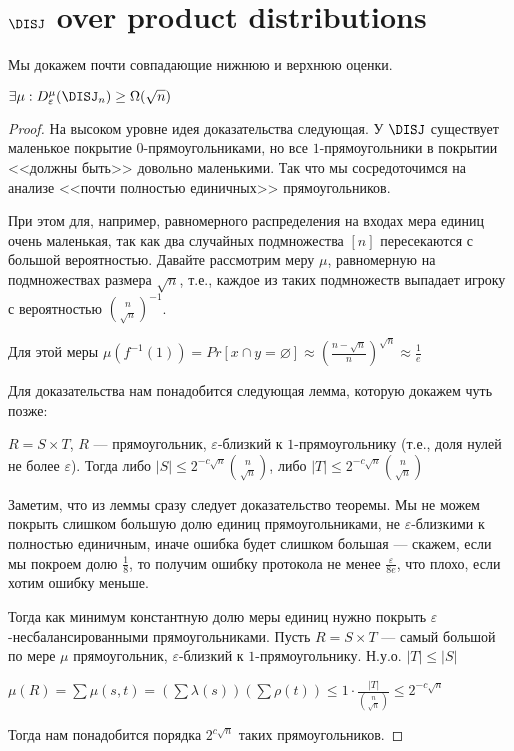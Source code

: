 \section{$\DISJ$ over product distributions}

Мы докажем почти совпадающие нижнюю и верхнюю оценки.

\begin{theorem}
$\exists \mu : D_{\varepsilon}^{\mu}(\DISJ_n) \geq \Omega(\sqrt{n})$
\end{theorem}

\begin{proof}

На высоком уровне идея доказательства следующая. У $\DISJ$ существует маленькое покрытие $0$-прямоугольниками, но все $1$-прямоугольники в покрытии <<должны быть>> довольно маленькими. Так что мы сосредоточимся на анализе <<почти полностью единичных>> прямоугольников.

При этом для, например, равномерного распределения на входах мера единиц очень маленькая, так как два случайных подмножества $[n]$ пересекаются с большой вероятностью. Давайте рассмотрим меру $\mu$, равномерную на подмножествах размера $\sqrt{n}$, т.е., каждое из таких подмножеств выпадает игроку с вероятностью ${{n}\choose{\sqrt{n}}}^{-1}$. 

Для этой меры $\mu(f^{-1}(1)) = Pr[x \cap y = \varnothing] \approx (\frac{n -  \sqrt{n}}{n})^{\sqrt{n}} \approx \frac{1}{e}$

Для доказательства нам понадобится следующая лемма, которую докажем чуть позже:

\begin{lemma}
$R = S \times T$, $R$ --- прямоугольник, $\varepsilon$-близкий к $1$-прямоугольнику (т.е., доля нулей не более $\varepsilon$). Тогда либо $|S| \leq 2^{-c\sqrt{n}} {{n}\choose{\sqrt{n}}}$, либо $|T| \leq 2^{-c\sqrt{n}} {{n}\choose{\sqrt{n}}}$ 
\end{lemma}

Заметим, что из леммы сразу следует доказательство теоремы. Мы не можем покрыть слишком большую долю единиц прямоугольниками, не $\varepsilon$-близкими к полностью единичным, иначе ошибка будет слишком большая --- скажем, если мы покроем долю $\frac{1}{8}$, то получим ошибку протокола не менее $\frac{\varepsilon}{8e}$, что плохо, если хотим ошибку меньше.

Тогда как минимум константную долю меры единиц нужно покрыть $\varepsilon$-несбалансированными прямоугольниками. Пусть $R = S \times T$ --- самый большой по мере $\mu$ прямоугольник, $\varepsilon$-близкий к $1$-прямоугольнику. Н.у.о. $|T| \leq |S|$

$\mu(R) = \sum \mu(s,t) = (\sum \lambda(s))(\sum \rho(t)) \leq 1 \cdot \frac{|T|}{{{n}\choose{\sqrt{n}}}} \leq 2^{-c\sqrt{n}}$

Тогда нам понадобится порядка $2^{c\sqrt{n}}$ таких прямоугольников.

\end{proof}


